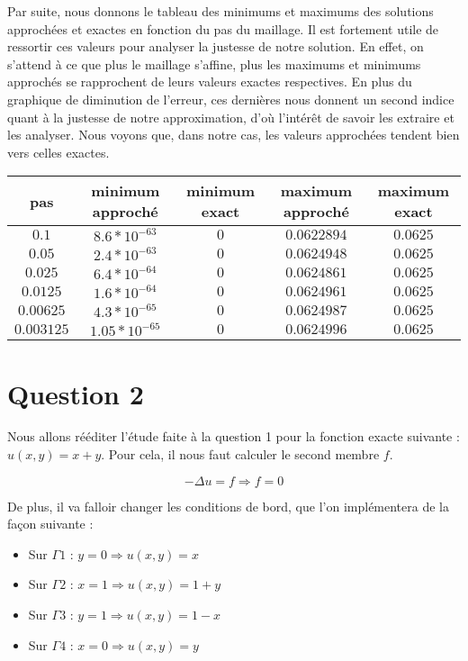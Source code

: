 \documentclass[11pt,a4paper]{report}
\begin{document}
			Par suite, nous donnons le tableau des minimums et maximums des solutions approchées et exactes en fonction du pas du maillage. Il est fortement utile de ressortir ces valeurs pour analyser la justesse de notre solution. En effet, on s'attend à ce que plus le maillage s'affine, plus les maximums et minimums approchés se rapprochent de leurs valeurs exactes respectives. En plus du graphique de diminution de l'erreur, ces dernières nous donnent un second indice quant à la justesse de notre approximation, d'où l'intérêt de savoir les extraire et les analyser. Nous voyons que, dans notre cas, les valeurs approchées tendent bien vers celles exactes.		
		
			\begin{center}
				\begin{tabular}{|c|c|c|c|c|}
					\hline
					pas & minimum approché & minimum exact & maximum approché & maximum exact \\
					\hline 
					$0.1$ & $8.6*10^{-63}$ & $0$ & $0.0622894$ & $0.0625$\\ 
					\hline 
					$0.05$ & $2.4*10^{-63}$ & $0$ & $0.0624948$ & $0.0625$\\ 
					\hline 
					$0.025$ & $6.4*10^{-64}$ & $0$ & $0.0624861$ & $0.0625$  \\ 
					\hline 
					$0.0125$ & $1.6*10^{-64}$ & $0$ & $0.0624961$ & $0.0625$\\ 
					\hline 
					$0.00625$ & $4.3*10^{-65}$ & $0$ & $0.0624987$ & $0.0625$ \\ 
					\hline 
					$0.003125$ & $1.05*10^{-65}$ & $0$ & $0.0624996$ & $0.0625$ \\ 
					\hline 
				\end{tabular} 
			\end{center}
			
		
		\section*{Question 2}
		
			Nous allons rééditer l'étude faite à la question 1 pour la fonction exacte suivante : $ u(x,y) = x + y$. Pour cela, il nous faut calculer le second membre $f$. 
			
			\[
			- \Delta u = f \Longrightarrow f = 0 
			\]
			
			De plus, il va falloir changer les conditions de bord, que l'on implémentera de la façon suivante : 
			
			\begin{itemize}
				\item Sur $ \Gamma 1 $ : $ y = 0 \Longrightarrow u(x,y) = x$ 
				\item Sur $ \Gamma 2 $ : $ x = 1 \Longrightarrow u(x,y) = 1 + y $
				\item Sur $ \Gamma 3 $ : $ y = 1 \Longrightarrow u(x,y) = 1 - x$
				\item Sur $ \Gamma 4 $ : $ x = 0 \Longrightarrow u(x,y) = y$
				 
			\end{itemize}
			
\end{document}
